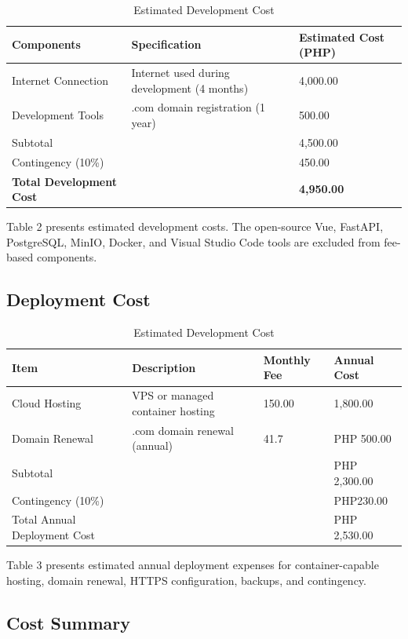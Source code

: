 \documentclass[12pt, letterpaper]{article}
\begin{document}
\begin{table}[htbp]
\centering
\caption{Estimated Development Cost}
\begin{tabular}{p{4cm} p{6cm} p{3cm}}
\toprule
\textbf{Components} & \textbf{Specification} & \textbf{Estimated Cost (PHP)} \\
\midrule
\rowcolor{gray!15}
Internet Connection & Internet used during development (4 months) & 4,000.00 \\
Development Tools   & .com domain registration (1 year) & 500.00 \\
\rowcolor{gray!15}
Subtotal            & & 4,500.00 \\
Contingency (10\%)  & & 450.00 \\
\rowcolor{gray!15}
\textbf{Total Development Cost} & & \textbf{4,950.00} \\
\bottomrule
\end{tabular}
\end{table}
\hspace*{2em}Table 2 presents estimated development costs. The open-source Vue, FastAPI, PostgreSQL, MinIO, Docker, and Visual Studio Code tools are excluded from fee-based components.
 \subsection*{Deployment Cost}


\begin{table}[h]
\centering
\caption{Estimated Development Cost}
\begin{tabular}{p{4cm} p{4cm} p{3cm} p{3cm}}
\toprule
\textbf{Item} & \textbf{Description} & \textbf{Monthly Fee} & \textbf{Annual Cost} \\
\midrule
Cloud Hosting & VPS or managed container hosting & 150.00 & 1,800.00 \\
Domain Renewal  & .com domain renewal (annual) & 41.7 & PHP 500.00\\
Subtotal            & & & PHP 2,300.00 \\
Contingency (10\%) & & &PHP230.00 \\
Total Annual Deployment Cost & & & PHP 2,530.00 \\
\bottomrule
\end{tabular}
\end{table}
\hspace*{2em}Table 3 presents estimated annual deployment expenses for container-capable hosting, domain renewal, HTTPS configuration, backups, and contingency.
 \subsection*{Cost Summary}
\end{document}

